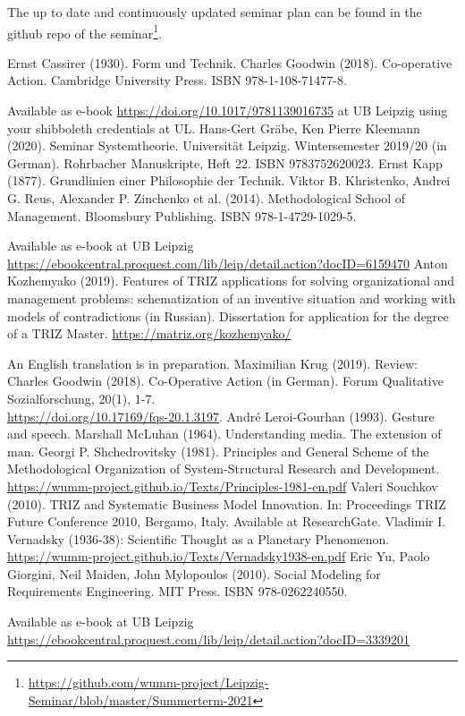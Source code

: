\documentclass[11pt,a4paper]{article}
\begin{document}
The up to date and continuously updated seminar plan can be found in the
github repo of the
seminar\footnote{\url{https://github.com/wumm-project/Leipzig-Seminar/blob/master/Summerterm-2021}}.

\begin{thebibliography}{xxx}
 Ernst Cassirer (1930). Form und Technik.  
 Charles Goodwin (2018). Co-operative Action.  Cambridge
  University Press. ISBN 978-1-108-71477-8.
  
  Available as e-book \url{https://doi.org/10.1017/9781139016735} at UB
  Leipzig using your shibboleth credentials at UL.
 Hans-Gert Gräbe, Ken Pierre Kleemann (2020). Seminar
  Systemtheorie. Universität Leipzig. Wintersemester 2019/20 (in German).
  Rohrbacher Manuskripte, Heft 22. ISBN 9783752620023.
 Ernst Kapp (1877). Grundlinien einer Philosophie der
  Technik.
 Viktor B. Khristenko, Andrei G. Reus, Alexander
  P. Zinchenko et al. (2014). Methodological School of Management. Bloomsbury
  Publishing.  ISBN 978-1-4729-1029-5.

  Available as e-book at UB Leipzig\\
  \url{https://ebookcentral.proquest.com/lib/leip/detail.action?docID=6159470}
 Anton Kozhemyako (2019). Features of TRIZ
  applications for solving organizational and management problems:
  schematization of an inventive situation and working with models of
  contradictions (in Russian).  Dissertation for application for the degree of
  a TRIZ Master. \url{https://matriz.org/kozhemyako/}

  An English translation is in preparation.
 Maximilian Krug (2019). Review: Charles Goodwin (2018).
  Co-Operative Action (in German). Forum Qualitative Sozialforschung, 20(1),
  1-7.  \\ \url{https://doi.org/10.17169/fqs-20.1.3197}.
 André Leroi-Gourhan (1993).  Gesture and speech. 
 Marshall McLuhan (1964).  Understanding media. The
  extension of man. 
 Georgi P. Shchedrovitsky (1981). Principles and
  General Scheme of the Methodological Organization of System-Structural
  Research and Development.  \\
  \url{https://wumm-project.github.io/Texts/Principles-1981-en.pdf}
 Valeri Souchkov (2010).  TRIZ and Systematic Business
  Model Innovation.  In: Proceedings TRIZ Future Conference 2010, Bergamo,
  Italy.   Available at ResearchGate.
 Vladimir I. Vernadsky (1936-38): Scientific Thought as
  a Planetary Phenomenon.\\
  \url{https://wumm-project.github.io/Texts/Vernadsky1938-en.pdf}
 Eric Yu, Paolo Giorgini, Neil Maiden, John Mylopoulos (2010).
  Social Modeling for Requirements Engineering. MIT Press.  ISBN
  978-0262240550.
  
  Available as e-book at UB Leipzig\\
  \url{https://ebookcentral.proquest.com/lib/leip/detail.action?docID=3339201}
\end{thebibliography}
\end{document}
